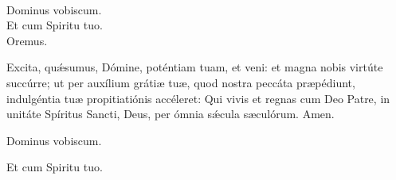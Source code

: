 \\
  \rubric{\Vbar}Dominus vobiscum.
\\
  \rubric{\Rbar}Et cum Spiritu tuo.
\\
Oremus.

Excita, quǽsumus, Dómine, poténtiam tuam, et veni: et magna nobis virtúte succúrre; ut per auxílium grátiæ tuæ, quod nostra peccáta præpédiunt, indulgéntia tuæ propitiatiónis accéleret: Qui vivis et regnas cum Deo Patre, in unitáte Spíritus Sancti, Deus, per ómnia sǽcula sæculórum.\rubric{\Rbar} Amen.

  \rubric{\Vbar}Dominus vobiscum.

  \rubric{\Rbar}Et cum Spiritu tuo.


